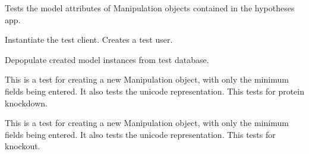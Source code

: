 \documentclass[letterpaper,10pt,english]{sphinxmanual}
\begin{document}

\begin{fulllineitems}
\label{api:experimentdb.hypotheses.tests.ManipulationModelTests}
Tests the model attributes of Manipulation objects contained in the hypotheses app.


\begin{fulllineitems}
\label{api:experimentdb.hypotheses.tests.ManipulationModelTests.setUp}
Instantiate the test client.  Creates a test user.


\end{fulllineitems}


\begin{fulllineitems}
\label{api:experimentdb.hypotheses.tests.ManipulationModelTests.tearDown}
Depopulate created model instances from test database.


\end{fulllineitems}


\begin{fulllineitems}
\label{api:experimentdb.hypotheses.tests.ManipulationModelTests.test_create_manipulation_minimal_knockdown}
This is a test for creating a new Manipulation object, with only the minimum fields being entered.  It also tests the unicode representation.  This tests for protein knockdown.


\end{fulllineitems}


\begin{fulllineitems}
\label{api:experimentdb.hypotheses.tests.ManipulationModelTests.test_create_manipulation_minimal_knockout}
This is a test for creating a new Manipulation object, with only the minimum fields being entered.  It also tests the unicode representation.  This tests for knockout.



\end{fulllineitems}
\end{fulllineitems}
\end{document}
